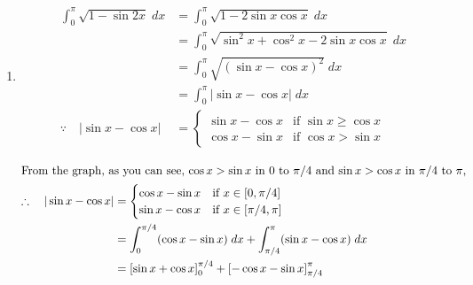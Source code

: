 \begin{enumerate}
\begin{solution}
\begin{enumerate}
                \item
                    \begin{align*}
                        \int_0^\pi \sqrt{1 - \sin 2x} \; dx &= \int_0^\pi \sqrt{1 - 2\sin x \cos x} \; dx\\
                        &= \int_0^\pi \sqrt{\sin^2 x + \cos^2 x - 2\sin x \cos x} \; dx\\
                        &= \int_0^\pi \sqrt{(\sin x - \cos x)^2} \; dx\\
                        &= \int_0^\pi |\sin x - \cos x| \; dx\\
                        \because \quad |\sin x - \cos x| &= \begin{cases}
                            \sin x - \cos x & \text{if } \sin x \geq \cos x\\
                            \cos x - \sin x & \text{if } \cos x > \sin x
                        \end{cases}
                    \end{align*}
                    \begin{center}
                    \end{center}
                    \begin{align*}
                        \intertext{From the graph, as you can see, $\cos x > \sin x$ in $0$ to $\pi/4$ and $\sin x > \cos x$ in $\pi/4$ to $\pi$,}
                        \therefore \quad |\sin x - \cos x| &= \begin{cases}
                            \cos x - \sin x & \text{if } x \in [0, \pi/4]\\
                            \sin x - \cos x & \text{if } x \in [\pi/4, \pi]
                        \end{cases}\\
                        &= \int_0^{\pi/4} (\cos x - \sin x) \; dx + \int_{\pi/4}^\pi (\sin x - \cos x) \; dx\\
                        &= \left[\sin x + \cos x\right]_0^{\pi/4} + \left[-\cos x - \sin x\right]_{\pi/4}^\pi\\

\end{align*}
\end{enumerate}
\end{solution}
\end{enumerate}
